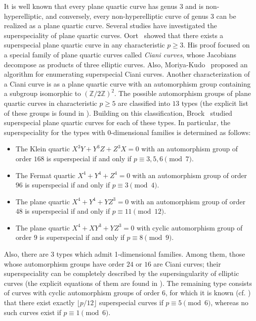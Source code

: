 \documentclass{article}
\theoremstyle{definition}
\begin{document}
It is well known that every plane quartic curve has genus $3$ and is non-hyperelliptic, and conversely, every non-hyperelliptic curve of genus $3$ can be realized as a plane quartic curve.
Several studies have investigated the superspeciality of plane quartic curves.
Oort~\cite[Theorem 5.12(1)]{Oort} showed that there exists a superspecial plane quartic curve in any characteristic $p \geq 3$.
His proof focused on a special family of plane quartic curves called \hspace{-0.2mm}\emph{Ciani curves}, whose Jacobians decompose as products of three elliptic curves.
Also, Moriya-Kudo~\cite{MK} proposed an algorithm for enumerating superspecial Ciani curves.
Another characterization of a Ciani curve is as a plane quartic curve with an automorphism group containing a subgroup isomorphic to $(\mathbb{Z}/2\mathbb{Z})^2$.
The possible automorphism groups of plane quartic curves in characteristic $p \geq 5$ are classified into $13$ types (the explicit list of these groups is found in \cite[Theorem 6.5.2]{Dolgachev}).
Building on this classification, Brock~\cite{Brock} studied superspecial plane quartic curves for each of these types. %
In particular, the superspeciality for the types with $0$-dimensional families is determined as follows:\vspace{-0.4mm}
\begin{itemize}
    \item The Klein quartic $X^3Y+Y^3Z+Z^3X = 0$ with an automorphism group of order $168$ is superspecial if and only if $p \equiv 3,5,6 \pmod{7}$.\vspace{-0.8mm}
    \item The Fermat quartic $X^4+Y^4+Z^4 = 0$ with an automorphism group of order $96$ is superspecial if and only if $p \equiv 3 \pmod{4}$.\vspace{-0.8mm}
    \item The plane quartic $X^4+Y^4+YZ^3 = 0$ with an automorphism group of order $48$ is superspecial if and only if $p \equiv 11 \pmod{12}$.\vspace{-0.8mm}
    \item The plane quartic $X^4+XY^3+YZ^3 = 0$ with cyclic automorphism group of order $9$ is superspecial if and only if $p \equiv 8 \pmod{9}$.\vspace{0.4mm}
\end{itemize}
Also, there are $3$ types which admit 1-dimensional families.
Among them, those whose automorphism groups have order $24$ or $16$ are Ciani curves; \hspace{0.5mm}their superspeciality can be completely described by the supersingularity of elliptic curves (the explicit equations of them are found in \cite[Sections 4--5]{MS}).
The remaining type consists of curves with cyclic automorphism groups of order $6$, for which it is known (cf. \cite{OKH}) that there exist exactly $\lfloor p/12 \rfloor$ superspecial curves if $p \equiv 5 \pmod{6}$, whereas no such curves exist if $p \equiv 1 \pmod{6}$.
\end{document}
